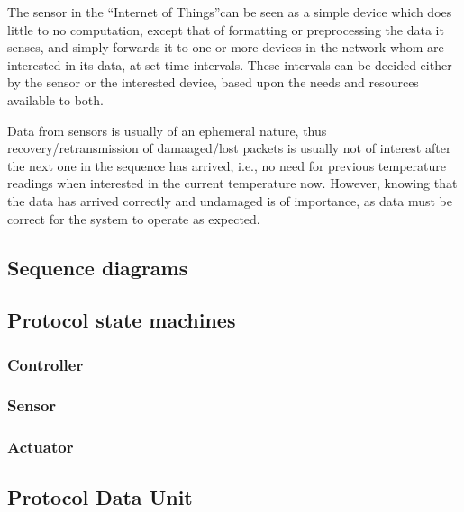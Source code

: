 The sensor in the ``Internet of Things''can be seen as a simple device which does little to no computation, except that of formatting or preprocessing the data it senses, and simply forwards it to one or more devices in the network whom are interested in its data, at set time intervals. These intervals can be decided either by the sensor or the interested device, based upon the needs and resources available to both.

Data from sensors is usually of an ephemeral nature, thus recovery/retransmission of damaaged/lost packets is usually not of interest after the next one in the sequence has arrived, i.e., no need for previous temperature readings when interested in the current temperature now. However, knowing that the data has arrived correctly and undamaged is of importance, as data must be correct for the system to operate as expected.


\subsection{Sequence diagrams} %
\label{sub:message_passing}

\subsection{Protocol state machines} %
\label{sub:states}

\subsubsection{Controller} %
\label{ssub:controller}

\subsubsection{Sensor} %
\label{ssub:sensor}

\subsubsection{Actuator} %
\label{ssub:actuator}




\subsection{Protocol Data Unit} %
\label{sub:protocol_data_unit}



